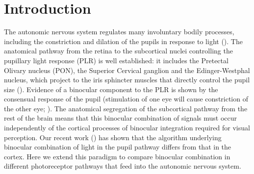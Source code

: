 \documentclass[
]{article}
\begin{document}
\section{Introduction}\label{introduction}

The autonomic nervous system regulates many involuntary bodily processes, including the constriction and dilation of the pupils in response to light (). The anatomical pathway from the retina to the subcortical nuclei controlling the pupillary light response (PLR) is well established: it includes the Pretectal Olivary nucleus (PON), the Superior Cervical ganglion and the Edinger-Westphal nucleus, which project to the iris sphincter muscles that directly control the pupil size (). Evidence of a binocular component to the PLR is shown by the consensual response of the pupil (stimulation of one eye will cause constriction of the other eye; ). The anatomical segregation of the subcortical pathway from the rest of the brain means that this binocular combination of signals must occur independently of the cortical processes of binocular integration required for visual perception. Our recent work () has shown that the algorithm underlying binocular combination of light in the pupil pathway differs from that in the cortex. Here we extend this paradigm to compare binocular combination in different photoreceptor pathways that feed into the autonomic nervous system.
\end{document}
